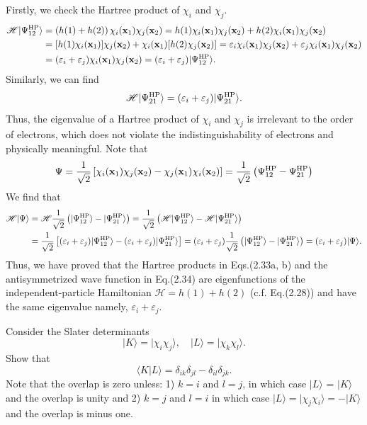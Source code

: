\documentclass[a4paper]{book}
\newcommand{\bfx}{{\bf x}}
\newcommand{\HP}{{\rm HP}}
\begin{document}
	\begin{solution}
	Firstly, we check the Hartree product of $\chi_i$ and $\chi_j$.
	\begin{align}
		\mathscr{H} | \Psi^\HP_{12} \rangle &= \left( h(1) + h(2) \right) \chi_i(\bfx_1) \chi_j(\bfx_2) = h(1) \chi_i(\bfx_1) \chi_j(\bfx_2) + h(2) \chi_i(\bfx_1) \chi_j(\bfx_2) \notag \\
		&= [ h(1) \chi_i(\bfx_1) ] \chi_j(\bfx_2) + \chi_i(\bfx_1) [ h(2) \chi_j(\bfx_2) ] = \varepsilon_i \chi_i(\bfx_1)\chi_j(\bfx_2) + \varepsilon_j \chi_i(\bfx_1) \chi_j(\bfx_2) \notag \\
		&= ( \varepsilon_i + \varepsilon_j ) \chi_i(\bfx_1) \chi_j(\bfx_2) = ( \varepsilon_i + \varepsilon_j ) | \Psi^\HP_{12} \rangle.
	\end{align}
	Similarly, we can find
	\begin{equation}
		\mathscr{H} | \Psi^\HP_{21} \rangle = ( \varepsilon_i + \varepsilon_j ) | \Psi^\HP_{21} \rangle.
	\end{equation}
	Thus, the eigenvalue of a Hartree product of $\chi_i$ and $\chi_j$ is irrelevant to the order of electrons, which does not violate the indistinguishability of electrons and physically meaningful. Note that
	\[
		\Psi = \frac{1}{\sqrt{2}} \left[ \chi_i(\bfx_1) \chi_j(\bfx_2) - \chi_j(\bfx_1) \chi_i(\bfx_2) \right] = \frac{1}{\sqrt{2}} \left( \Psi^\HP_{12} - \Psi^\HP_{21} \right)
	\]
	We find that
	\begin{align}
		\mathscr{H} | \Psi \rangle &= \mathscr{H} \frac{1}{\sqrt{2}} \left( | \Psi^\HP_{12} \rangle - | \Psi^\HP_{21} \rangle \right) = \frac{1}{\sqrt{2}} \left( \mathscr{H} | \Psi^\HP_{12} \rangle - \mathscr{H} | \Psi^\HP_{21} \rangle \right) \notag \\
		&= \frac{1}{\sqrt{2}} \left[ ( \varepsilon_i + \varepsilon_j ) | \Psi^\HP_{12} \rangle - ( \varepsilon_i + \varepsilon_j ) | \Psi^\HP_{21} \rangle \right] = ( \varepsilon_i + \varepsilon_j ) \frac{1}{\sqrt{2}} \left( | \Psi^\HP_{12} \rangle - | \Psi^\HP_{21} \rangle \right) = ( \varepsilon_i + \varepsilon_j ) | \Psi \rangle.
	\end{align}
	Thus, we have proved that the Hartree products in Eqs.(2.33a, b) and the antisymmetrized wave function in Eq.(2.34) are eigenfunctions of the independent-particle Hamiltonian $\mathscr{H} = h(1) + h(2)$ (c.f. Eq.(2.28)) and have the same eigenvalue namely, $\varepsilon_i + \varepsilon_j$. 
	\end{solution}
	
	\begin{exercise}
	Consider the Slater determinants
	\[
		| K \rangle = | \chi_i \chi_j \rangle, \quad | L \rangle = | \chi_k \chi_l \rangle.
	\]
	Show that
	\[
		\langle K | L \rangle = \delta_{ik} \delta_{jl} - \delta_{il} \delta_{jk}.
	\]
	Note that the overlap is zero unless: 1) $k=i$ and $l=j$, in which case $|L\rangle$ = $|K\rangle$ and the overlap is unity and 2) $k=j$ and $l=i$ in which case $|L\rangle= |\chi_j \chi_i \rangle = -|K\rangle$ and the overlap is minus one.
	\end{exercise}
	
\end{document}
